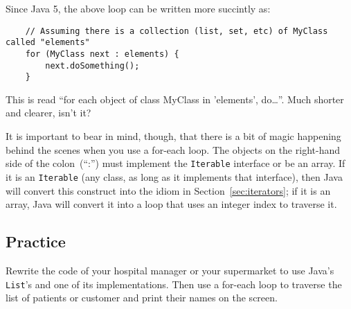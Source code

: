 Since Java 5, the above loop can be written more succintly as: 

\begin{verbatim}
    // Assuming there is a collection (list, set, etc) of MyClass called "elements"
    for (MyClass next : elements) {
        next.doSomething();
    }    
\end{verbatim}

This is read ``for each object of class MyClass in 'elements',
do\ldots''. Much shorter and clearer, isn't it? 

It is important to bear in mind, though,
that there is a bit of magic happening behind the scenes when you use
a for-each loop. The objects on the right-hand side of the
colon~(``:'') must implement the \verb+Iterable+ interface or be an
array. If it is an \verb+Iterable+ (any class, as long as it
implements that interface), then Java will convert this construct into
the idiom in Section~\ref{sec:iterators}; 
if it is an array, Java will convert it into a loop
that uses an integer index to traverse it. 

\subsection{Practice}
\label{sec:practice}

Rewrite the code of your hospital manager or your supermarket to use
Java's \verb+List+'s and one of its implementations. Then use a
for-each loop to traverse the list of patients or customer and print
their names on the screen. 


